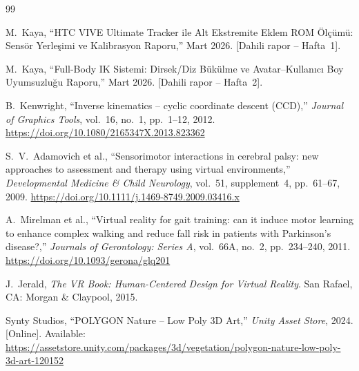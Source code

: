 \documentclass[11pt,a4paper]{article}
\begin{document}
\begin{thebibliography}{99}

M.~Kaya, ``HTC VIVE Ultimate Tracker ile Alt Ekstremite Eklem ROM
\"Ol\c{c}\"um\"u: Sens\"or Yerle\c{s}imi ve Kalibrasyon Raporu,''
Mart 2026. [Dahili rapor -- Hafta~1].

M.~Kaya, ``Full-Body IK Sistemi: Dirsek/Diz B\"uk\"ulme ve
Avatar--Kullan{\i}c{\i} Boy Uyumsuzlu\u{g}u Raporu,''
Mart 2026. [Dahili rapor -- Hafta~2].

B.~Kenwright, ``Inverse kinematics -- cyclic coordinate descent (CCD),''
\textit{Journal of Graphics Tools}, vol.~16, no.~1, pp.~1--12, 2012.
\url{https://doi.org/10.1080/2165347X.2013.823362}

S.~V.~Adamovich et al., ``Sensorimotor interactions in cerebral palsy:
new approaches to assessment and therapy using virtual environments,''
\textit{Developmental Medicine \& Child Neurology}, vol.~51, supplement~4,
pp.~61--67, 2009.
\url{https://doi.org/10.1111/j.1469-8749.2009.03416.x}

A.~Mirelman et al., ``Virtual reality for gait training: can it induce
motor learning to enhance complex walking and reduce fall risk in patients
with Parkinson's disease?,''
\textit{Journals of Gerontology: Series A}, vol.~66A, no.~2,
pp.~234--240, 2011.
\url{https://doi.org/10.1093/gerona/glq201}

J.~Jerald, \textit{The VR Book: Human-Centered Design for Virtual Reality}.
San Rafael, CA: Morgan \& Claypool, 2015.

Synty Studios, ``POLYGON Nature -- Low Poly 3D Art,''
\textit{Unity Asset Store}, 2024.
[Online]. Available: \url{https://assetstore.unity.com/packages/3d/vegetation/polygon-nature-low-poly-3d-art-120152}

\end{thebibliography}
\end{document}
